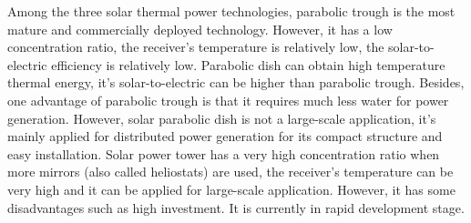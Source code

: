 
Among the three solar thermal power technologies, parabolic trough is the most mature and commercially deployed technology. However, it has a low concentration ratio, the receiver's temperature is relatively low, the solar-to-electric efficiency is relatively low. Parabolic dish can obtain high temperature thermal energy, it's solar-to-electric can be higher than parabolic trough.
Besides, one advantage of parabolic trough is that it requires much less water for power generation. However, solar parabolic dish is not a large-scale application, it's mainly applied for distributed power generation for its compact structure and easy installation. Solar power tower has a very high concentration ratio when more mirrors (also called heliostats) are used, the receiver's temperature can be very high and it can be applied for large-scale application. However, it has some disadvantages such as high investment. It is currently in rapid development stage.

